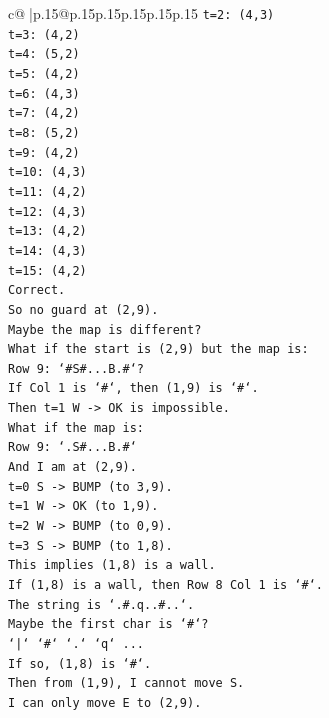 \documentclass{article}
\begin{document}
{\begin{supertabular}{c@{$\;$}|p{.15\linewidth}@{}p{.15\linewidth}p{.15\linewidth}p{.15\linewidth}p{.15\linewidth}p{.15\linewidth}}
{{{\texttt{t=2: (4,3)} \\
\texttt{t=3: (4,2)} \\
\texttt{t=4: (5,2)} \\
\texttt{t=5: (4,2)} \\
\texttt{t=6: (4,3)} \\
\texttt{t=7: (4,2)} \\
\texttt{t=8: (5,2)} \\
\texttt{t=9: (4,2)} \\
\texttt{t=10: (4,3)} \\
\texttt{t=11: (4,2)} \\
\texttt{t=12: (4,3)} \\
\texttt{t=13: (4,2)} \\
\texttt{t=14: (4,3)} \\
\texttt{t=15: (4,2)} \\
\texttt{Correct.} \\
\texttt{So no guard at (2,9).} \\
\texttt{Maybe the map is different?} \\
\texttt{What if the start is (2,9) but the map is:} \\
\texttt{Row 9: `\#S\#...B.\#`?} \\
\texttt{If Col 1 is `\#`, then (1,9) is `\#`.} \\
\texttt{Then t=1 W {-}> OK is impossible.} \\
\texttt{What if the map is:} \\
\texttt{Row 9: `.S\#...B.\#`} \\
\texttt{And I am at (2,9).} \\
\texttt{t=0 S {-}> BUMP (to 3,9).} \\
\texttt{t=1 W {-}> OK (to 1,9).} \\
\texttt{t=2 W {-}> BUMP (to 0,9).} \\
\texttt{t=3 S {-}> BUMP (to 1,8).} \\
\texttt{This implies (1,8) is a wall.} \\
\texttt{If (1,8) is a wall, then Row 8 Col 1 is `\#`.} \\
\texttt{The string is `.\#.q..\#..`.} \\
\texttt{Maybe the first char is `\#`?} \\
\texttt{`|` `\#` `.` `q` ...} \\
\texttt{If so, (1,8) is `\#`.} \\
\texttt{Then from (1,9), I cannot move S.} \\
\texttt{I can only move E to (2,9).} \\
}}}
\end{supertabular}}
\end{document}
